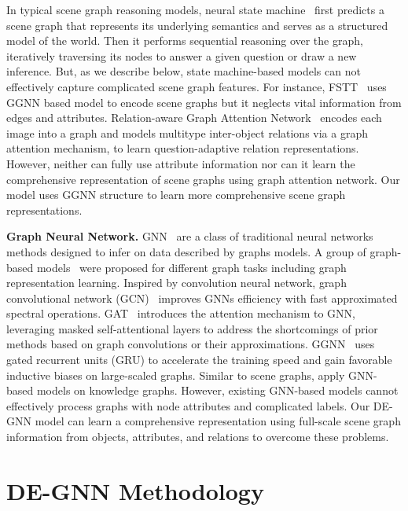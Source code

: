 \documentclass[letterpaper]{article} %
\begin{document}
In typical scene graph reasoning models, neural state machine~\cite{DBLP:conf/nips/HudsonM19} first predicts a scene graph that represents its underlying semantics and serves as a structured model of the world. 
Then it performs sequential reasoning over the graph, iteratively traversing its nodes to answer a given question or draw a new inference. 
But, as we describe below, state machine-based models can not effectively capture complicated scene graph features.
For instance, FSTT~\cite{inproceedings} uses GGNN based model to encode scene graphs but it neglects vital information from edges and attributes. Relation-aware Graph Attention Network~\cite{DBLP:conf/iccv/LiGCL19} encodes each image into a graph and models multitype inter-object relations via a graph attention mechanism, to learn question-adaptive relation representations. However, neither can fully use attribute information nor can it learn the comprehensive representation of scene graphs using graph attention network. 
Our model uses GGNN structure to learn more comprehensive scene graph representations. 

\vspace{0.05in}
\noindent\textbf{Graph Neural Network.}
GNN~\cite{DBLP:journals/tnn/ScarselliGTHM09} are a class of traditional neural networks methods designed to infer on data described by graphs models. 
A group of graph-based models~\cite{DBLP:conf/aaai/0001RFHLRG19,DBLP:conf/aaai/LiuCLZLSQ19} were proposed for different graph tasks including graph representation learning. 
Inspired by convolution neural network, graph convolutional network (GCN)~\cite{DBLP:conf/iclr/KipfW17} improves GNNs efficiency with fast approximated spectral operations. 
GAT~\cite{DBLP:conf/iclr/VelickovicCCRLB18} introduces the attention mechanism to GNN, leveraging masked self-attentional layers to address the shortcomings of prior methods based on graph convolutions or their approximations. GGNN~\cite{DBLP:journals/corr/LiTBZ15} uses gated recurrent units (GRU) to accelerate the training speed and gain favorable inductive biases on large-scaled graphs.
Similar to scene graphs, \cite{DBLP:conf/cncl/WangGCL16,DBLP:conf/aaai/WangCGL18,DBLP:conf/aistats/SunL19} apply GNN-based models on knowledge graphs.
However, existing GNN-based models cannot effectively process graphs with node attributes and complicated labels. Our DE-GNN model can learn a comprehensive representation using full-scale scene graph information from objects, attributes, and relations to overcome these problems.

\section{DE-GNN Methodology}
\end{document}
